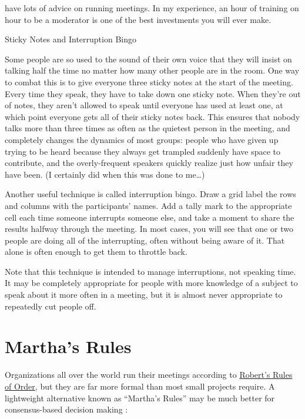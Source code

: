 \cite{Brow2007,Broo2016,Roge2018} have lots of advice on running meetings.
In my experience,
an hour of training on hour to be a moderator
is one of the best investments you will ever make.

\begin{aside}{Sticky Notes and Interruption Bingo}

  Some people are so used to the sound of their own voice
  that they will insist on talking half the time
  no matter how many other people are in the room.
  One way to combat this is to give everyone three sticky notes
  at the start of the meeting.
  Every time they speak,
  they have to take down one sticky note.
  When they're out of notes,
  they aren't allowed to speak until everyone has used at least one,
  at which point everyone gets all of their sticky notes back.
  This ensures that nobody talks more than three times as often as
  the quietest person in the meeting,
  and completely changes the dynamics of most groups:
  people who have given up trying to be heard because they always get trampled
  suddenly have space to contribute,
  and the overly-frequent speakers quickly realize just how unfair they have been.
  (I certainly did when this was done to me{\ldots})

  Another useful technique is called interruption bingo.
  Draw a grid label the rows and columns with the participants' names.
  Add a tally mark to the appropriate cell
  each time someone interrupts someone else,
  and take a moment to share the results halfway through the meeting.
  In most cases,
  you will see that one or two people are doing all of the interrupting,
  often without being aware of it.
  That alone is often enough to get them to throttle back.

  Note that this technique is intended to manage interruptions,
  not speaking time.
  It may be completely appropriate for people with more knowledge of a subject
  to speak about it more often in a meeting,
  but it is almost never appropriate to repeatedly cut people off.

\end{aside}

\section{Martha's Rules}\label{s:meetings-marthas-rules}

Organizations all over the world run their meetings according to
\href{https://en.wikipedia.org/wiki/Robert\%27s\_Rules\_of\_Order}{Robert's Rules of Order},
but they are far more formal than most small projects require.
A lightweight alternative known as ``Martha's Rules''
may be much better for consensus-based decision making \cite{Mina1986}:

